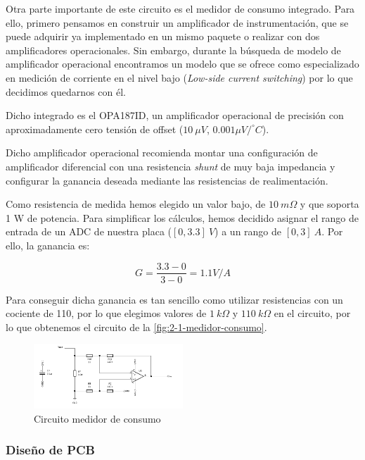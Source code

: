 Otra parte importante de este circuito es el medidor de consumo integrado. Para ello, primero pensamos en construir un amplificador de instrumentación, que se puede adquirir ya implementado en un mismo paquete o realizar con dos amplificadores operacionales. Sin embargo, durante la búsqueda de modelo de amplificador operacional encontramos un modelo que se ofrece como especializado en medición de corriente en el nivel bajo (\textit{Low-side current switching}) por lo que decidimos quedarnos con él.

Dicho integrado es el OPA187ID, un amplificador operacional de precisión con aproximadamente cero tensión de offset ($10\ \mu V$, $0.001\mu V/^\circ\! C$). \cite{OPA187DataSheet}

Dicho amplificador operacional recomienda montar una configuración de amplificador diferencial con una resistencia \textit{shunt} de muy baja impedancia y configurar la ganancia deseada mediante las resistencias de realimentación.

Como resistencia de medida hemos elegido un valor bajo, de $10\ m\Omega$ y que soporta 1 W de potencia. Para simplificar los cálculos, hemos decidido asignar el rango de entrada de un ADC de nuestra placa ($[0, 3.3]\ V$) a un rango de $[0, 3]\ A$. Por ello, la ganancia es:

\[
    G = \frac{3.3 - 0}{3 - 0} = 1.1 V/A  
\]

Para conseguir dicha ganancia es tan sencillo como utilizar resistencias con un cociente de 110, por lo que elegimos valores de $1\ k\Omega$ y $110\ k\Omega$ en el circuito, por lo que obtenemos el circuito de la \autoref{fig:2-1-medidor-consumo}.

\begin{figure}[h]
    \centering
    \includegraphics[width=0.5\textwidth]{images/2/2-1/circuitoConsumo.png}
    \caption{Circuito medidor de consumo}
    \label{fig:2-1-medidor-consumo}
\end{figure}

\subsubsection{Diseño de PCB}

